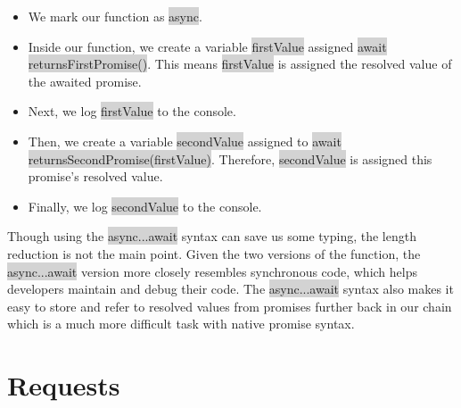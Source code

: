 \documentclass[11pt]{article}
\begin{document}
\begin{itemize}[leftmargin = *]
\item We mark our function as \colorbox{lightgray}{async}.
\item Inside our function, we create a variable \colorbox{lightgray}{firstValue} assigned \colorbox{lightgray}{await returnsFirstPromise()}. This means \colorbox{lightgray}{firstValue} is assigned the resolved value of the awaited promise.
\item Next, we log \colorbox{lightgray}{firstValue} to the console.
\item Then, we create a variable \colorbox{lightgray}{secondValue} assigned to \colorbox{lightgray}{await returnsSecondPromise(firstValue)}. Therefore, \colorbox{lightgray}{secondValue} is assigned this promise’s resolved value.
\item Finally, we log \colorbox{lightgray}{secondValue} to the console.
\end{itemize}
Though using the \colorbox{lightgray}{async...await} syntax can save us some typing, the length reduction is not the main point. Given the two versions of the function, the \colorbox{lightgray}{async...await} version more closely resembles synchronous code, which helps developers maintain and debug their code. The \colorbox{lightgray}{async...await} syntax also makes it easy to store and refer to resolved values from promises further back in our chain which is a much more difficult task with native promise syntax. 










\newpage
\section{Requests}
\end{document}
